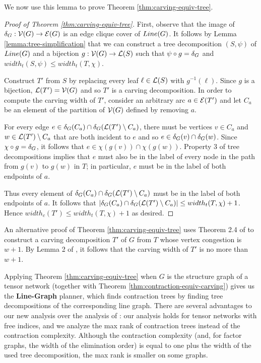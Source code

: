 We now use this lemma to prove Theorem \ref{thm:carving-equiv-tree}.

\begin{proof}[Proof of Theorem \ref{thm:carving-equiv-tree}]
First, observe that the image of $\delta_{G}: \mathcal{V}(G) \rightarrow \mathcal{E}(G)$ is an edge clique cover of $Line(G)$. It follows by Lemma \ref{lemma:tree-simplification} that we can construct a tree decomposition $(S, \psi)$ of $Line(G)$ and a bijection $g: \mathcal{V}(G) \rightarrow \mathcal{L}(S)$ such that $\psi \circ g = \delta_{G}$ and $width_t(S, \psi) \leq width_t(T, \chi)$.

Construct $T'$ from $S$ by replacing every leaf $\ell \in \mathcal{L}(S)$ with $g^{-1}(\ell)$. Since $g$ is a bijection, $\mathcal{L}(T') = \mathcal{V}(G)$ and so $T'$ is a carving decomposition. In order to compute the carving width of $T'$, consider an arbitrary arc $a \in \mathcal{E}(T')$ and let $C_a$ be an element of the partition of $\mathcal{V}(G)$ defined by removing $a$. 

For every edge $e \in \delta_{G}(C_a) \cap \delta_{G}(\mathcal{L}(T') \setminus C_a)$, there must be vertices $v \in C_a$ and $w \in \mathcal{L}(T') \setminus C_a$ that are both incident to $e$ and so $e \in \delta_{G}(v) \cap \delta_{G}(w)$. Since $\chi \circ g = \delta_{G}$, it follows that $e \in \chi(g(v)) \cap \chi(g(w))$.  Property 3 of tree decompositions implies that $e$ must also be in the label of every node in the path from $g(v)$ to $g(w)$ in $T$; in particular, $e$ must be in the label of both endpoints of $a$.

Thus every element of $\delta_{G}(C_a) \cap \delta_{G}(\mathcal{L}(T') \setminus C_a)$ must be in the label of both endpoints of $a$. It follows that $|\delta_{G}(C_a) \cap \delta_{G}(\mathcal{L}(T') \setminus C_a)| \leq width_t(T, \chi)+1$. Hence $width_c(T') \leq width_t(T, \chi)+1$ as desired.
\end{proof}

An alternative proof of Theorem \ref{thm:carving-equiv-tree} uses Theorem 2.4 of \cite{HW18} to construct a carving decomposition $T'$ of $G$ from $T$ whose vertex congestion is $w+1$. By Lemma 2 of \cite{ACDJPS07}, it follows that the carving width of $T'$ is no more than $w+1$.

Applying Theorem \ref{thm:carving-equiv-tree} when $G$ is the structure graph of a tensor network (together with Theorem \ref{thm:contraction-equiv-carving}) gives us the \textbf{Line-Graph} planner, which finds contraction trees by finding tree decompositions of the corresponding line graph. There are several advantages to our new analysis over the analysis of \cite{MS08}: our analysis holds for tensor networks with free indices, and we analyze the max rank of contraction trees instead of the contraction complexity. Although the contraction complexity (and, for factor graphs, the width of the elimination order) is equal to one plus the width of the used tree decomposition, the max rank is smaller on some graphs.
